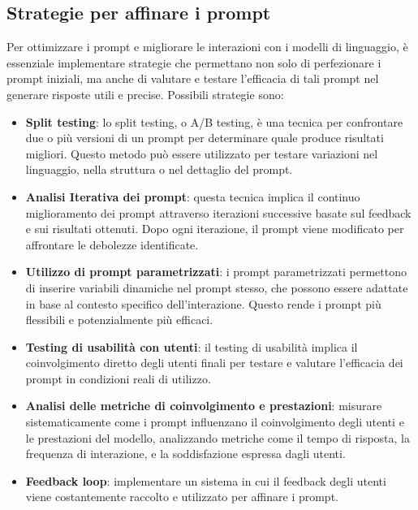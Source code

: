     \subsection{Strategie per affinare i prompt}
        Per ottimizzare i prompt e migliorare le interazioni con i modelli di linguaggio, è essenziale implementare strategie che permettano non solo di perfezionare i prompt iniziali, ma anche di valutare e testare l'efficacia di tali prompt nel generare risposte utili e precise. Possibili strategie sono:
        \begin{itemize}
            \item \textbf{Split testing}: lo split testing, o A/B testing, è una tecnica per confrontare due o più versioni di un prompt per determinare quale produce risultati migliori. Questo metodo può essere utilizzato per testare variazioni nel linguaggio, nella struttura o nel dettaglio del prompt.
            
            \item \textbf{Analisi Iterativa dei prompt}: questa tecnica implica il continuo miglioramento dei prompt attraverso iterazioni successive basate sul feedback e sui risultati ottenuti. Dopo ogni iterazione, il prompt viene modificato per affrontare le debolezze identificate.
            
            \item \textbf{Utilizzo di prompt parametrizzati}: i prompt parametrizzati permettono di inserire variabili dinamiche nel prompt stesso, che possono essere adattate in base al contesto specifico dell'interazione. Questo rende i prompt più flessibili e potenzialmente più efficaci.
            
            \item \textbf{Testing di usabilità con utenti}: il testing di usabilità implica il coinvolgimento diretto degli utenti finali per testare e valutare l'efficacia dei prompt in condizioni reali di utilizzo.
            
            \item \textbf{Analisi delle metriche di coinvolgimento e prestazioni}: misurare sistematicamente come i prompt influenzano il coinvolgimento degli utenti e le prestazioni del modello, analizzando metriche come il tempo di risposta, la frequenza di interazione, e la soddisfazione espressa dagli utenti.
            
            \item \textbf{Feedback loop}: implementare un sistema in cui il feedback degli utenti viene costantemente raccolto e utilizzato per affinare i prompt.
        \end{itemize}
        
